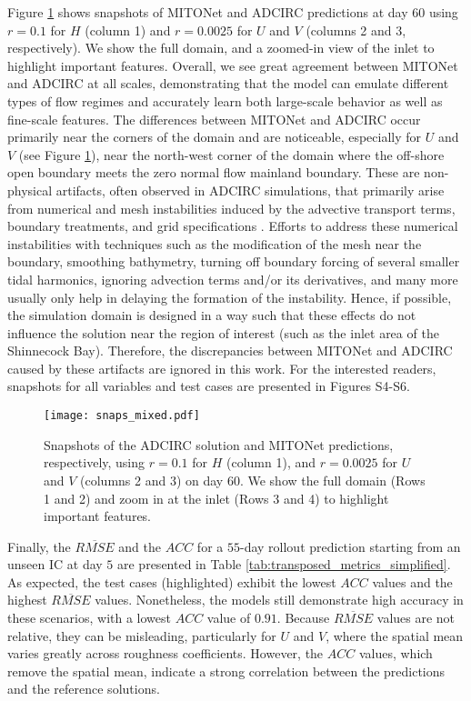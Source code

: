 \documentclass[draft]{agujournal2019}
\begin{document}
Figure \ref{fig:snaps_mixed} shows snapshots of MITONet and ADCIRC predictions at day 60 using $r=0.1$ for $H$ (column 1) and $r=0.0025$ for $U$ and $V$ (columns 2 and 3, respectively). We show the full domain, and a zoomed-in view of the inlet to highlight important features. Overall, we see great agreement between MITONet and ADCIRC at all scales, demonstrating that the model can emulate different types of flow regimes and accurately learn both large-scale behavior as well as fine-scale features. The differences between MITONet and ADCIRC occur primarily near the corners of the domain and are noticeable, especially for $U$ and $V$ (see Figure \ref{fig:snaps_mixed}), near the north-west corner of the domain where the off-shore open boundary meets the zero normal flow mainland boundary. These are non-physical artifacts, often observed in ADCIRC simulations, that primarily arise from numerical and mesh instabilities induced by the advective transport terms, boundary treatments, and grid specifications \cite{RTI2015_adcirc}. Efforts to address these numerical instabilities with techniques such as the modification of the mesh near the boundary, smoothing bathymetry, turning off boundary forcing of several smaller tidal harmonics, ignoring advection terms and/or its derivatives, and many more usually only help in delaying the formation of the instability. Hence, if possible, the simulation domain is designed in a way such that these effects do not influence the solution near the region of interest (such as the inlet area of the Shinnecock Bay). Therefore, the discrepancies between MITONet and ADCIRC caused by these artifacts are ignored in this work. For the interested readers, snapshots for all variables and test cases are presented in Figures S4-S6.

\begin{figure}[h]
    \centering
    \texttt{[image: snaps\_mixed.pdf]}
    \caption{Snapshots of the ADCIRC solution and MITONet predictions, respectively, using $r=0.1$ for $H$ (column 1), and $r=0.0025$ for $U$ and $V$ (columns 2 and 3) on day 60. We show the full domain (Rows 1 and 2) and zoom in at the inlet (Rows 3 and 4) to highlight important features.}
    \label{fig:snaps_mixed}
\end{figure}

Finally, the $\overline{RMSE}$ and the $ACC$ for a $55$-day rollout prediction starting from an unseen IC at day $5$ are presented in Table \ref{tab:transposed_metrics_simplified}.  As expected, the test cases (highlighted) exhibit the lowest $ACC$ values and the highest $\overline{RMSE}$ values. Nonetheless, the models still demonstrate high accuracy in these scenarios, with a lowest $ACC$ value of $0.91$. Because $\overline{RMSE}$ values are not relative, they can be misleading, particularly for $U$ and $V$,  where the spatial mean varies greatly across roughness coefficients. However, the $ACC$ values, which remove the spatial mean, indicate a strong correlation between the predictions and the reference solutions.
\end{document}
